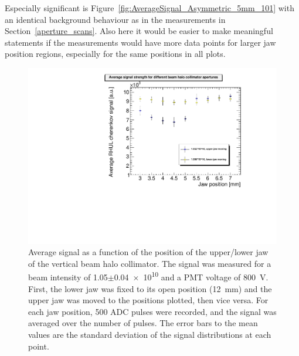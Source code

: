 Especially significant is Figure~\ref{fig:AverageSignal_Asymmetric_5mm_101} with an identical background behaviour as in the measurements in Section~\ref{aperture_scans}. Also here it would be easier to make meaningful statements if the measurements would have more data points for larger jaw position regions, especially for the same positions in all plots.
\begin{figure}
\centering
\includegraphics[width=\textwidth]{Figures/AverageSignal_perJawPosition.pdf}
\caption[RHUL Cherenkov detector signal vs. collimator half aperture]{Average signal as a function of the position of the upper/lower jaw of the vertical beam halo collimator. The signal was measured for a beam intensity of \num{1.05}$\pm$\num{0.04e10} and a PMT voltage of \SI{800}{\volt}. First, the lower jaw was fixed to its open position (\SI{12}{\milli\metre}) and the upper jaw was moved to the positions plotted, then vice versa. For each jaw position, 500 ADC pulses were recorded, and the signal was averaged over the number of pulses. The error bars to the mean values are the standard deviation of the signal distributions at each point.}
\label{fig:AverageSignal_HalfAperture}
\end{figure}
